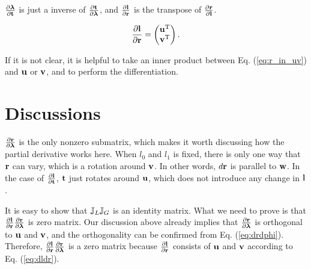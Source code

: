 \documentclass[12pt,a4paper]{scrarticle}
\begin{document}
$\frac{\partial{\boldsymbol{\lambda}}}{\partial{\mathbf{t}}}$ is just a inverse of $\frac{\partial{\mathbf{t}}}{\partial{\boldsymbol{\lambda}}}$, and $\frac{\partial{\mathbf{l}}}{\partial{\mathbf{r}}}$ is the transpose of $\frac{\partial{\mathbf{r}}}{\partial{\mathbf{l}}}$.

\begin{equation}\label{eq:dldr}
\frac{\partial{\mathbf{l}}}{\partial{\mathbf{r}}}=
    \begin{pmatrix}
     \mathbf{u}^{\mathrm{T}} \\
     \mathbf{v}^{\mathrm{T}}
    \end{pmatrix}.    
\end{equation}

If it is not clear, it is helpful to take an inner product between Eq. (\ref{eq:r_in_uv}) and $\mathbf{u}$ or $\mathbf{v}$, and to perform the differentiation.

\section{Discussions}

$\frac{\partial{\mathbf{r}}}{\partial{\boldsymbol{\lambda}}}$ is the only nonzero submatrix, which makes it worth discussing how the partial derivative works here. When $l_0$ and $l_1$ is fixed, there is only one way that $\mathbf{r}$ can vary, which is a rotation around $\mathbf{v}$. In other words, $d\mathbf{r}$ is parallel to $\mathbf{w}$. In the case of $\frac{\partial{\mathbf{l}}}{\partial{\mathbf{t}}}$, $\mathbf{t}$ just rotates around $\mathbf{u}$, which does not introduce any change in $\mathbf{l}$.

It is easy to show that $\mathbb{J}_{L}\mathbb{J}_{G}$ is an identity matrix. What we need to prove is that $\frac{\partial{\mathbf{l}}}{\partial{\mathbf{r}}} \frac{\partial{\mathbf{r}}}{\partial{\boldsymbol{\lambda}}}$ is zero matrix.  Our discussion above already implies that $\frac{\partial{\mathbf{r}}}{\partial{\boldsymbol{\lambda}}}$ is orthogonal to $\mathbf{u}$ and $\mathbf{v}$, and the orthogonality can be confirmed from Eq. (\ref{eq:drdphi}). Therefore, $\frac{\partial{\mathbf{l}}}{\partial{\mathbf{r}}} \frac{\partial{\mathbf{r}}}{\partial{\boldsymbol{\lambda}}}$ is a zero matrix because $\frac{\partial{\mathbf{l}}}{\partial{\mathbf{r}}}$ consists of $\mathbf{u}$ and $\mathbf{v}$ according to Eq. (\ref{eq:dldr}).
\end{document}

